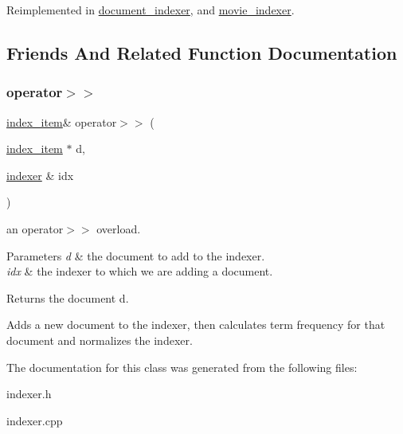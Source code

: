 Reimplemented in \hyperlink{classdocument__indexer_ab6573986790793c03f05192a526d217d}{document\+\_\+indexer}, and \hyperlink{classmovie__indexer_aeaadd1ac660403a0f55122c6afea3acc}{movie\+\_\+indexer}.



\subsection{Friends And Related Function Documentation}
\mbox{\label{classindexer_af6526a689e8ed16f67708180a988b8d8}} 
\subsubsection{\texorpdfstring{operator$>$$>$}{operator>>}}
{\footnotesize\ttfamily \hyperlink{classindex__item}{index\+\_\+item}\& operator$>$$>$ (\begin{DoxyParamCaption}\item[{\hyperlink{classindex__item}{index\+\_\+item} $\ast$}]{d,  }\item[{\hyperlink{classindexer}{indexer} \&}]{idx }\end{DoxyParamCaption})\hspace{0.3cm}{\ttfamily [friend]}}



an operator$>$$>$ overload. 


\begin{DoxyParams}{Parameters}
{\em d} & the document to add to the indexer. \\
\hline
{\em idx} & the indexer to which we are adding a document. \\
\hline
\end{DoxyParams}
\begin{DoxyReturn}{Returns}
the document d.
\end{DoxyReturn}
Adds a new document to the indexer, then calculates term frequency for that document and normalizes the indexer. 

The documentation for this class was generated from the following files\+:\begin{DoxyCompactItemize}
\item 
indexer.\+h\item 
indexer.\+cpp\end{DoxyCompactItemize}
